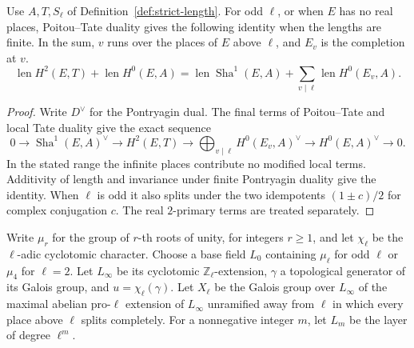 \begin{lemma}\label{lem:pt-length-identity}
Use \(A,T,S_\ell\) of Definition~\ref{def:strict-length}.
For odd \(\ell\), or when \(E\) has no real places, Poitou--Tate duality \cite{milne-duality} gives the following identity when the
lengths are finite. In the sum, \(v\) runs over the places of
\(E\) above \(\ell\), and \(E_v\) is the completion at \(v\).
\[
 \operatorname{len}H^2(E,T)+\operatorname{len}H^0(E,A)
 =
 \operatorname{len}\operatorname{Sha}^1(E,A)+
 \sum_{v\mid\ell}\operatorname{len}H^0(E_v,A).
\]
\end{lemma}
\begin{proof}
Write \(D^\vee\) for the Pontryagin dual. The final terms of
Poitou--Tate and local Tate duality give the exact sequence
\[
 0\longrightarrow\operatorname{Sha}^1(E,A)^\vee
 \longrightarrow H^2(E,T)\longrightarrow
 \bigoplus_{v\mid\ell}H^0(E_v,A)^\vee
 \longrightarrow H^0(E,A)^\vee\longrightarrow0 .
\]
In the stated range the infinite places contribute no modified
local terms. Additivity of length and invariance under finite
Pontryagin duality give the identity. When \(\ell\) is odd it
also splits under the two idempotents \((1\pm c)/2\) for complex
conjugation \(c\). The real \(2\)-primary terms are treated separately.
\end{proof}

\begin{paramdefinition}\label{hyp:strict-tower}
Write \(\mu_r\) for the group of \(r\)-th roots of unity, for
integers \(r\ge1\), and let \(\chi_\ell\) be the \(\ell\)-adic
cyclotomic character. Choose a base field \(L_0\) containing
\(\mu_\ell\) for odd \(\ell\) or \(\mu_4\) for \(\ell=2\).
Let \(L_\infty\) be its cyclotomic \(\mathbb Z_\ell\)-extension,
\(\gamma\) a topological generator of its Galois group, and
\(u=\chi_\ell(\gamma)\). Let \(X_\ell\) be the Galois group over \(L_\infty\) of
the maximal abelian pro-\(\ell\) extension of \(L_\infty\)
unramified away from \(\ell\) in which every place above \(\ell\)
splits completely. For a nonnegative integer \(m\), let \(L_m\)
be the layer of degree \(\ell^m\).
\end{paramdefinition}


